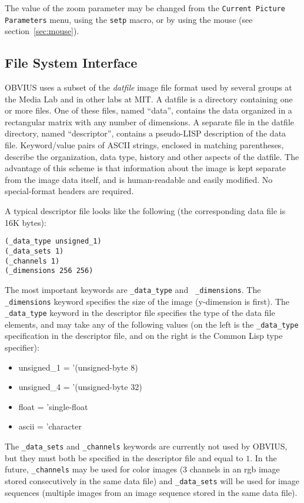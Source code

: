 The value of the zoom parameter may be changed from the {\tt Current
Picture Parameters} menu, using the {\tt setp} macro, or by using the mouse
(see section~\ref{sec:mouse}).



\subsection{File System Interface}
\label{sec:datfile}

OBVIUS uses a subset of the {\em datfile} image file format used by
several groups at the Media Lab and in other labs at MIT.  A datfile
is a directory containing one or more files.  One of these files,
named ``data'', contains the data organized in a rectangular matrix
with any number of dimensions.  A separate file in the datfile
directory, named ``descriptor'', contains a pseudo-LISP description of
the data file.  Keyword/value pairs of ASCII strings, enclosed in
matching parentheses, describe the organization, data type, history
and other aspects of the datfile.  The advantage of this scheme is
that information about the image is kept separate from the image data
itself, and is human-readable and easily modified.  No special-format
headers are required.

A typical descriptor file looks like the following (the corresponding
data file is 16K bytes):
\begin{verbatim}
(_data_type unsigned_1) 
(_data_sets 1) 
(_channels 1) 
(_dimensions 256 256) 
\end{verbatim}
The most important keywords are {\tt \_data\_type} and {\tt
\_dimensions}.  The {\tt \_dimensions} keyword specifies the size of the
image (y-dimension is first).  The {\tt \_data\_type} keyword
in the descriptor file specifies the type of the data file elements,
and may take any of the following values (on the left is the
{\tt \_data\_type} specification in the descriptor file, and on the right is
the Common Lisp type specifier):
\begin{itemize}
\item unsigned\_1 = '(unsigned-byte 8)
\item unsigned\_4 = '(unsigned-byte 32)
\item float = 'single-float
\item ascii = 'character
\end{itemize}
The {\tt \_data\_sets} and {\tt \_channels} keywords are currently not
used by OBVIUS, but they must both be specified in the descriptor file
and equal to $1$.  In the future, {\tt \_channels} may be used for color
images (3 channels in an rgb image stored consecutively in the same
data file) and {\tt \_data\_sets} will be used for image sequences (multiple
images from an image sequence stored in the same data file).  

